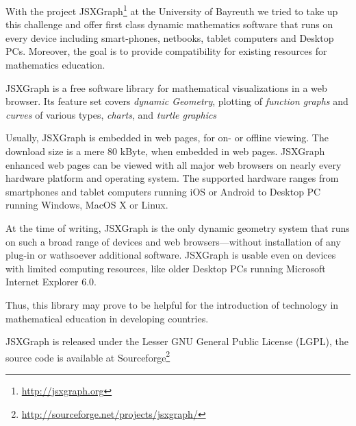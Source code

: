 \documentclass[12pt,a4paper]{article}%
\begin{document}
With the project JSXGraph\footnote{\href{http://jsxgraph.org}{http://jsxgraph.org}} 
at the University of Bayreuth we tried to take up 
this challenge and offer first class dynamic mathematics software that runs on 
every device including smart-phones, netbooks, tablet computers and Desktop PCs. 
Moreover, the goal is to provide compatibility for existing resources for 
mathematics education. 

JSXGraph is a free software library for mathematical visualizations in a web browser.
Its feature set covers {\sl dynamic Geometry}, plotting of {\sl function graphs} and
{\sl curves} of various types, {\sl charts}, and {\sl turtle graphics}

Usually, JSXGraph is embedded in web pages, for on- or off\/line viewing.
The download size is a mere 80 kByte, when embedded in web pages.
JSXGraph enhanced web pages can be viewed with all major web browsers 
on nearly every hardware platform and operating system.
The supported hardware ranges from smartphones and tablet computers 
running iOS or Android to Desktop PC running Windows, MacOS X or Linux.

At the time of writing, JSXGraph is the only dynamic geometry system that runs  
on such a broad range of  devices and web browsers---without installation of any plug-in 
or wathsoever additional software.
JSXGraph is usable even on devices with limited computing resources, 
like older Desktop PCs running Microsoft Internet Explorer 6.0. 

Thus, this library may prove to be helpful for the
introduction of technology in mathematical education in developing countries.

JSXGraph 
is released under the Lesser GNU General Public License (LGPL), the source code
is available at Sourceforge\footnote{\href{http://sourceforge.net/projects/jsxgraph/}{http://sourceforge.net/projects/jsxgraph/}}
\end{document}
